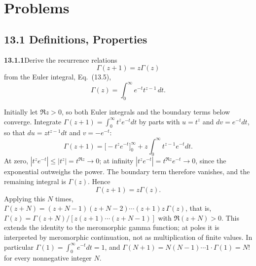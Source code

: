 
\section*{Problems}

\subsection*{13.1 Definitions, Properties}

\par\bigskip
\noindent\textbf{13.1.1}\quad Derive the recurrence relations
\[
\Gamma(z+1)=z\Gamma(z)
\]
from the Euler integral, Eq.~(13.5),
\[
\Gamma(z)=\int_{0}^{\infty}e^{-t}t^{z-1}\,dt.
\]
\par\smallskip
{}
\solution
Initially let $\Re z>0$, so both Euler integrals and the boundary
terms below converge.  Integrate $\Gamma(z+1)=\int_0^\infty t^ze^{-t}dt$
by parts with $u=t^z$ and $dv=e^{-t}dt$, so that $du=zt^{z-1}dt$ and
$v=-e^{-t}$:
\[
\Gamma(z+1)=\bigl[-t^ze^{-t}\bigr]_0^\infty
 +z\int_0^\infty t^{z-1}e^{-t}dt.
\]
At zero, $|t^ze^{-t}|\le|t^z|=t^{\Re z}\to0$; at infinity
$|t^ze^{-t}|=t^{\Re z}e^{-t}\to0$, since the exponential outweighs the
power.  The boundary term therefore vanishes, and the remaining
integral is $\Gamma(z)$.  Hence
\[
\boxed{\Gamma(z+1)=z\Gamma(z)}.
\]
Applying this $N$ times,
$\Gamma(z+N)=(z+N-1)(z+N-2)\cdots(z+1)z\,\Gamma(z)$, that is,
$\Gamma(z)=\Gamma(z+N)/[z(z+1)\cdots(z+N-1)]$ with
$\Re(z+N)>0$.  This extends the identity to the meromorphic gamma
function; at poles it is interpreted by meromorphic continuation,
not as multiplication of finite values.  In particular
$\Gamma(1)=\int_0^\infty e^{-t}dt=1$, and
$\Gamma(N+1)=N(N-1)\cdots1\cdot\Gamma(1)=N!$ for every nonnegative
integer $N$.


